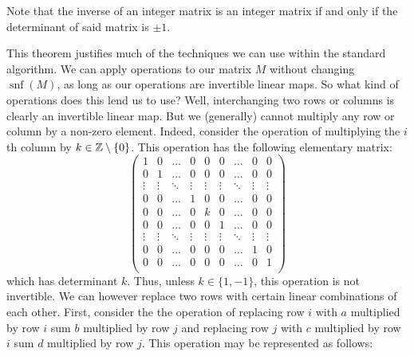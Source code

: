 Note that the inverse of an integer matrix is an integer matrix if and only if the determinant of said matrix is $\pm 1$.

This theorem justifies much of the techniques we can use within the standard algorithm. We can apply operations to our matrix $M$ without changing $\operatorname{snf}{(M)}$, as long as our operations are invertible linear maps. So what kind of operations does this lend us to use? Well, interchanging two rows or columns is clearly an invertible linear map. But we (generally) cannot multiply any row or column by a non-zero element. Indeed, consider the operation of multiplying the $i$th column by $k \in \mathbb{Z} \setminus \{0\}$. This operation has the following elementary matrix:
\[
	\begin{pmatrix}
		1      & 0      & \ldots & 0      & 0      & 0      & \ldots & 0      & 0      \\
		0      & 1      & \ldots & 0      & 0      & 0      & \ldots & 0      & 0      \\
		\vdots & \vdots & \ddots & \vdots & \vdots & \vdots & \ddots & \vdots & \vdots \\
		0      & 0      & \ldots & 1      & 0      & 0      & \ldots & 0      & 0      \\
		0      & 0      & \ldots & 0      & k      & 0      & \ldots & 0      & 0      \\
		0      & 0      & \ldots & 0      & 0      & 1      & \ldots & 0      & 0      \\
		\vdots & \vdots & \ddots & \vdots & \vdots & \vdots & \ddots & \vdots & \vdots \\
		0      & 0      & \ldots & 0      & 0      & 0      & \ldots & 1      & 0      \\
		0      & 0      & \ldots & 0      & 0      & 0      & \ldots & 0      & 1      \\
	\end{pmatrix}
\]
which has determinant $k$. Thus, unless $k \in \{1, -1\}$, this operation is not invertible. We can however replace two rows with certain linear combinations of each other. First, consider the the operation of replacing row $i$ with $a$ multiplied by row $i$ sum $b$ multiplied by row $j$ and replacing row $j$ with $c$ multiplied by row $i$ sum $d$ multiplied by row $j$. This operation may be represented as follows:
